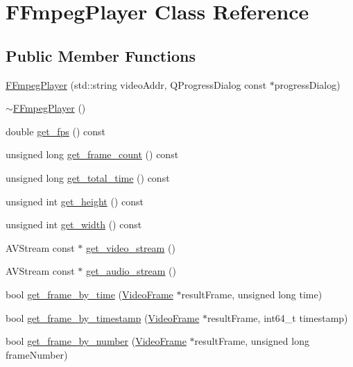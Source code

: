\hypertarget{classFFmpegPlayer}{}\section{F\+Fmpeg\+Player Class Reference}
\label{classFFmpegPlayer}
\subsection*{Public Member Functions}
\begin{DoxyCompactItemize}
\item 
\hyperlink{classFFmpegPlayer_ab51ec3c9c3d40680a69b02bda9767341}{F\+Fmpeg\+Player} (std\+::string video\+Addr, Q\+Progress\+Dialog const $\ast$progress\+Dialog)
\item 
\hyperlink{classFFmpegPlayer_ab6aa2a58362cee1c23d90bfa84164205}{$\sim$\+F\+Fmpeg\+Player} ()
\item 
double \hyperlink{classFFmpegPlayer_a2cdc53e1813de0723f2bfe869f0ad504}{get\+\_\+fps} () const 
\item 
unsigned long \hyperlink{classFFmpegPlayer_afb2c1a93fd9cc360340ff989b41500bd}{get\+\_\+frame\+\_\+count} () const 
\item 
unsigned long \hyperlink{classFFmpegPlayer_a2f71f53316479782cb09f78f1383380b}{get\+\_\+total\+\_\+time} () const 
\item 
unsigned int \hyperlink{classFFmpegPlayer_acfbe5305c4e30623ecc791519e2625d0}{get\+\_\+height} () const 
\item 
unsigned int \hyperlink{classFFmpegPlayer_a52cc701b9fdf9882a65be3f979f8d5a7}{get\+\_\+width} () const 
\item 
A\+V\+Stream const $\ast$ \hyperlink{classFFmpegPlayer_a5ed6acba145aeb2a63626f6008b2b56e}{get\+\_\+video\+\_\+stream} ()
\item 
A\+V\+Stream const $\ast$ \hyperlink{classFFmpegPlayer_a134ebdd27b8edf065fcd3e825ec5e114}{get\+\_\+audio\+\_\+stream} ()
\item 
bool \hyperlink{classFFmpegPlayer_a7f14f3411a6f959f3e796d713de1b056}{get\+\_\+frame\+\_\+by\+\_\+time} (\hyperlink{classVideoFrame}{Video\+Frame} $\ast$result\+Frame, unsigned long time)
\item 
bool \hyperlink{classFFmpegPlayer_a4561d19e9d7b0820c202037d754bb049}{get\+\_\+frame\+\_\+by\+\_\+timestamp} (\hyperlink{classVideoFrame}{Video\+Frame} $\ast$result\+Frame, int64\+\_\+t timestamp)
\item 
bool \hyperlink{classFFmpegPlayer_a7ba674baeb349fd6cba4514993abd745}{get\+\_\+frame\+\_\+by\+\_\+number} (\hyperlink{classVideoFrame}{Video\+Frame} $\ast$result\+Frame, unsigned long frame\+Number)

\end{DoxyCompactItemize}

